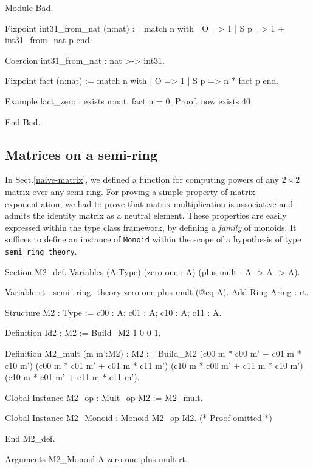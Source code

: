 \begin{Coqbad}
Module Bad.

Fixpoint int31_from_nat (n:nat) :=
  match n with
  | O => 1
  | S p => 1 + int31_from_nat p
  end.

Coercion int31_from_nat : nat >-> int31.

Fixpoint fact (n:nat) := 
  match n with
   | O => 1
   | S p => n * fact p
  end.

Example fact_zero : exists n:nat, fact n = 0.
Proof.  now exists 40%

End Bad.
\end{Coqbad}

\subsection{Matrices on a semi-ring}

In Sect.\vref{naive-matrix}, we defined a function for computing powers of any $2\times 2$ 
matrix over any semi-ring. For proving a simple property of matrix exponentiation, we had
 to prove that matrix multiplication is associative and admits the identity matrix as a neutral element. These properties are easily expressed within the type class framework, by defining a \emph{family} of monoids.
It suffices to define an instance of \texttt{Monoid} within the scope of a hypothesis
of type \texttt{semi\_ring\_theory}.

\begin{Coqsrc}
Section M2_def.
Variables (A:Type)
           (zero one : A) 
           (plus mult  : A -> A -> A).

 Variable rt : semi_ring_theory  zero one plus mult  (@eq A).
 Add  Ring Aring : rt.
\end{Coqsrc}

\begin{Coqsrc}
Structure M2 : Type := {c00 : A;  c01 : A;
                        c10 : A;  c11 : A}.

Definition Id2 : M2 := Build_M2 1 0 0 1.

Definition M2_mult (m m':M2) : M2 :=
 Build_M2 
          (c00 m * c00 m' + c01 m * c10 m')
          (c00 m * c01 m' + c01 m * c11 m')
          (c10 m * c00 m' + c11 m * c10 m')
          (c10 m * c01 m' + c11 m * c11 m').

Global Instance M2_op : Mult_op M2 := M2_mult.
\end{Coqsrc}

\begin{Coqsrc}
Global Instance M2_Monoid : Monoid   M2_op Id2.
(* Proof omitted *)

End M2_def.

Arguments M2_Monoid {A zero one plus mult} rt.
\end{Coqsrc}


